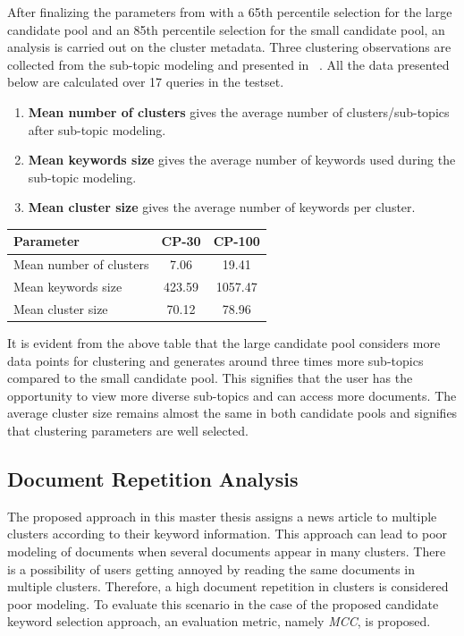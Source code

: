 After finalizing the parameters from  with a 65th percentile selection for the large candidate pool and an 85th percentile selection for the small candidate pool, an analysis is carried out on the cluster metadata. Three clustering observations are collected from the sub-topic modeling and presented in ~. All the data presented below are calculated over 17 queries in the testset.

\begin{enumerate}
	\item \textbf{Mean number of clusters} gives the average number of clusters/sub-topics after sub-topic modeling.
	\item \textbf{Mean keywords size} gives the average number of keywords used during the sub-topic modeling.
	\item \textbf{Mean cluster size} gives the average number of keywords per cluster.
\end{enumerate}

\begin{center}
	\label{tab:keyword_analysis}
	\begin{tabularx}{.6\textwidth}{|Y|c|c|}
		\hline
		Parameter & CP-30 & CP-100 \\
		\hline
		Mean number of clusters & 7.06 & 19.41 \\
		\hline
		Mean keywords size & 423.59 & 1057.47 \\
		\hline
		Mean cluster size & 70.12 & 78.96 \\
		\hline
	\end{tabularx}
\end{center}

It is evident from the above table that the large candidate pool considers more data points for clustering and generates around three times more sub-topics compared to the small candidate pool. This signifies that the user has the opportunity to view more diverse sub-topics and can access more documents. The average cluster size remains almost the same in both candidate pools and signifies that clustering parameters are well selected.

 \subsection{Document Repetition Analysis}
 
The proposed approach in this master thesis assigns a news article to multiple clusters according to their keyword information. This approach can lead to poor modeling of documents when several documents appear in many clusters. There is a possibility of users getting annoyed by reading the same documents in multiple clusters. Therefore, a high document repetition in clusters is considered poor modeling. To evaluate this scenario in the case of the proposed candidate keyword selection approach, an evaluation metric, namely \textit{\ac{MCC}}, is proposed. 

